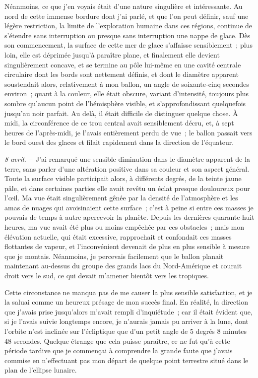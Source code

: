 \documentclass[french,twoside]{book} %
\begin{document}
Néanmoins, ce que j’en voyais était d’une nature singulière et intéressante. Au nord de cette immense bordure dont j’ai parlé, et que l’on peut définir, sauf une légère restriction, la limite de l’exploration humaine dans ces régions, continue de s’étendre sans interruption ou presque sans interruption une nappe de glace. Dès son commencement, la surface de cette mer de glace s’affaisse sensiblement ; plus loin, elle est déprimée jusqu’à paraître plane, et finalement elle devient singulièrement concave, et se termine au pôle lui-même en une cavité centrale circulaire dont les bords sont nettement définis, et dont le diamètre apparent soustendait alors, relativement à mon ballon, un angle de soixante-cinq secondes environ ; quant à la couleur, elle était obscure, variant d’intensité, toujours plus sombre qu’aucun point de l’hémisphère visible, et s’approfondissant quelquefois jusqu’au noir parfait. Au delà, il était difficile de distinguer quelque chose. À midi, la circonférence de ce trou central avait sensiblement décru, et, à sept heures de l’après-midi, je l’avais entièrement perdu de vue ; le ballon passait vers le bord ouest des glaces et filait rapidement dans la direction de l’équateur.\par
\emph{8 avril. –} J’ai remarqué une sensible diminution dans le diamètre apparent de la terre, sans parler d’une altération positive dans sa couleur et son aspect général. Toute la surface visible participait alors, à différents degrés, de la teinte jaune pâle, et dans certaines parties elle avait revêtu un éclat presque douloureux pour l’œil. Ma vue était singulièrement gênée par la densité de l’atmosphère et les amas de nuages qui avoisinaient cette surface ; c’est à peine si entre ces masses je pouvais de temps à autre apercevoir la planète. Depuis les dernières quarante-huit heures, ma vue avait été plus ou moins empêchée par ces obstacles ; mais mon élévation actuelle, qui était excessive, rapprochait et confondait ces masses flottantes de vapeur, et l’inconvénient devenait de plus en plus sensible à mesure que je montais. Néanmoins, je percevais facilement que le ballon planait maintenant au-dessus du groupe des grands lacs du Nord-Amérique et courait droit vers le sud, ce qui devait m’amener bientôt vers les tropiques.\par
Cette circonstance ne manqua pas de me causer la plus sensible satisfaction, et je la saluai comme un heureux présage de mon succès final. En réalité, la direction que j’avais prise jusqu’alors m’avait rempli d’inquiétude ; car il était évident que, si je l’avais suivie longtemps encore, je n’aurais jamais pu arriver à la lune, dont l’orbite n’est inclinée sur l’écliptique que d’un petit angle de 5 degrés 8 minutes 48 secondes. Quelque étrange que cela puisse paraître, ce ne fut qu’à cette période tardive que je commençai à comprendre la grande faute que j’avais commise en n’effectuant pas mon départ de quelque point terrestre situé dans le plan de l’ellipse lunaire.\par
\end{document}
